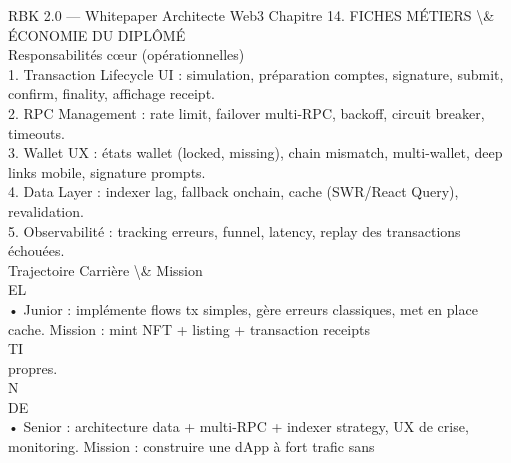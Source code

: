 RBK 2.0 — Whitepaper Architecte Web3                                              Chapitre 14. FICHES MÉTIERS \textbackslash{}& ÉCONOMIE DU DIPLÔMÉ\\
\vspace{0.5em}
\vspace{0.5em}
Responsabilités cœur (opérationnelles)\\
\vspace{0.5em}
1. Transaction Lifecycle UI : simulation, préparation comptes, signature, submit, confirm, finality, affichage receipt.\\
\vspace{0.5em}
2. RPC Management : rate limit, failover multi-RPC, backoff, circuit breaker, timeouts.\\
\vspace{0.5em}
3. Wallet UX : états wallet (locked, missing), chain mismatch, multi-wallet, deep links mobile, signature prompts.\\
\vspace{0.5em}
4. Data Layer : indexer lag, fallback onchain, cache (SWR/React Query), revalidation.\\
\vspace{0.5em}
5. Observabilité : tracking erreurs, funnel, latency, replay des transactions échouées.\\
\vspace{0.5em}
Trajectoire Carrière \textbackslash{}& Mission\\
\vspace{0.5em}
\vspace{0.5em}
\vspace{0.5em}
\vspace{0.5em}
EL\\
• Junior : implémente flows tx simples, gère erreurs classiques, met en place cache. Mission : mint NFT + listing + transaction receipts\\
\vspace{0.5em}
\vspace{0.5em}
\vspace{0.5em}
\vspace{0.5em}
TI\\
propres.\\
\vspace{0.5em}
\vspace{0.5em}
\vspace{0.5em}
\vspace{0.5em}
N\\
DE\\
• Senior : architecture data + multi-RPC + indexer strategy, UX de crise, monitoring. Mission : construire une dApp à fort trafic sans\\
